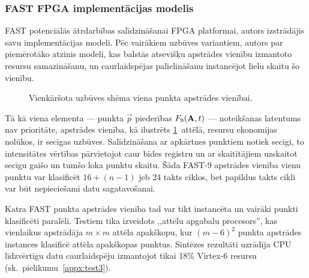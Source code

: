 \subsubsection{FAST FPGA implementācijas modelis} \label{sec:fast-fpga}
FAST potenciālās ātrdarbības salīdzināšanai FPGA platformai, autors
izstrādājis savu implementācijas modeli. Pēc vairākiem uzbūves variantiem,
autors par piemērotāko atzinis modeli, kas balstās atsevišķu apstrādes
vienību izmantoto resursu samazināšanu, un caurlaidspējas palielināšanu
instancējot lielu skaitu šo vienību.

\begin{figure}[tbh]
	\centering
	\def\svgwidth{\linewidth}
	{\small}
	\caption{Vienkāršota uzbūves shēma viena punkta apstrādes vienībai.}
	\label{fig:fast-fpga}
\end{figure}

Tā kā viena elementa --- punkta $\vec{p}$ piederības $F_9(\mathbf{A},t)$ ---
noteikšanas latentums nav prioritāte, apstrādes vienība, kā ilustrēts
\ref{fig:fast-fpga}~attēlā, resursu ekonomijas nolūkos, ir secīgas uzbūves.
Salīdzināšana ar apkārtnes punktiem notiek secīgi, to intensitātes vērtības
pārvietojot caur bīdes reģistru un ar skaitītājiem uzskaitot secīgu
gaišo un tumšo loka punktu skaitu. Šāda FAST-9 apstrādes vienība vienu punktu
var klasificēt $16+(n-1)$ jeb 24 takts ciklos, bet papildus takts cikli
var būt nepieciešami datu sagatavošanai.

Katra FAST punkta apstrādes vienība tad var tikt instancēta un vairāki
punkti klasificēti paralēli. Testiem tika izveidots
,,attēlu apgabalu procesors'', kas vienlaikus apstrādāja $m \times m$ attēla
apakškopu, kur ${(m-6)}^2$ punkta apstrādes instances klasificē attēla
apakškopas punktus. Sintēzes rezultāti uzrādīja CPU līdzvērtīgu datu
caurlaidspēju izmantojot tikai 18\% Virtex-6 resursu
(sk.~pielikumu~\ref{appx:test3}).

\TODO
